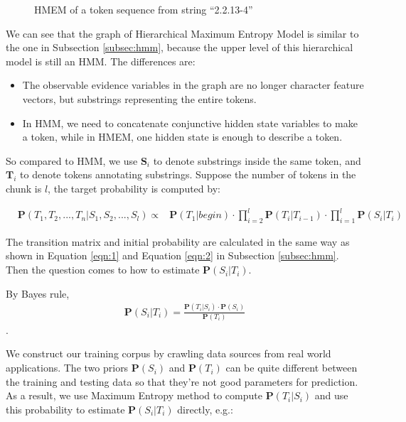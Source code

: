\begin{figure}[th]
\begin{center}
\end{center}
\caption{HMEM of a token sequence from string ``2.2.13-4''}\label{fig:hmem}
\end{figure}

We can see that the graph of Hierarchical Maximum Entropy Model is
similar to the one in Subsection \ref{subsec:hmm}, because the upper
level of this hierarchical model is still an HMM. The differences
are:

\begin{itemize}
\item The observable evidence variables in the graph are no longer
character feature vectors, but substrings representing the entire
tokens.
\item In HMM, we need to concatenate conjunctive hidden state
variables to make a token, while in HMEM, one hidden state is enough
to describe a token.
\end{itemize}

So compared to HMM, we use $\mathbf{S}_i$ to denote substrings
inside the same token, and $\mathbf{T}_i$ to denote tokens annotating
substrings. Suppose the number of tokens in the chunk is $l$, the
target probability is computed by:

\begin{eqnarray*}
& \mathbf{P}(T_1, T_2, ..., T_n|S_1, S_2, ..., S_l)  \propto &
\mathbf{P}(T_1|begin) \cdot \prod_{i=2}^{l}{\mathbf{P}(T_i|T_{i-1})}
\cdot \prod_{i=1}^{l}\mathbf{P}(S_i|T_i)
\end{eqnarray*}

The transition matrix and initial probability are calculated in the
same way as shown in Equation \ref{eqn:1} and Equation \ref{eqn:2}
in Subsection \ref{subsec:hmm}. Then the question comes to how to
estimate $\mathbf{P}(S_i|T_i)$.

By Bayes rule,
\begin{eqnarray*}
\mathbf{P}(S_i|T_i) = \frac{\mathbf{P}(T_i|S_i) \cdot
\mathbf{P}(S_i)}{\mathbf{P}(T_i)}
\end{eqnarray*}.

We construct our training corpus by crawling data sources from real
world applications. The two priors $\mathbf{P}(S_i)$ and
$\mathbf{P}(T_i)$ can be quite different between the training and
testing data so that they're not good parameters for prediction. As
a result, we use Maximum Entropy method to compute
$\mathbf{P}(T_i|S_i)$ and use this probability to estimate
$\mathbf{P}(S_i|T_i)$ directly, e.g.:

